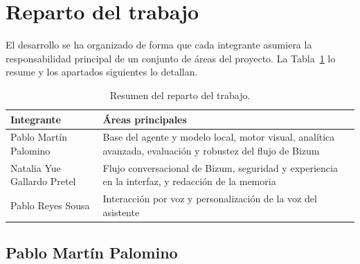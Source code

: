 \clearpage
\section{Reparto del trabajo}

El desarrollo se ha organizado de forma que cada integrante asumiera la
responsabilidad principal de un conjunto de áreas del proyecto. La
Tabla~\ref{tab:reparto} lo resume y los apartados siguientes lo detallan.

\begin{table}[h]
\centering
\begin{tabular}{lp{8.6cm}}
\toprule
\textbf{Integrante} & \textbf{Áreas principales} \\
\midrule
Pablo Martín Palomino
    & Base del agente y modelo local, motor visual, analítica avanzada,
      evaluación y robustez del flujo de Bizum \\[0.2cm]
Natalia Yue Gallardo Pretel
    & Flujo conversacional de Bizum, seguridad y experiencia en la interfaz,
      y redacción de la memoria \\[0.2cm]
Pablo Reyes Sousa
    & Interacción por voz y personalización de la voz del asistente \\
\bottomrule
\end{tabular}
\caption{Resumen del reparto del trabajo.}
\label{tab:reparto}
\end{table}

\subsection{Pablo Martín Palomino}

